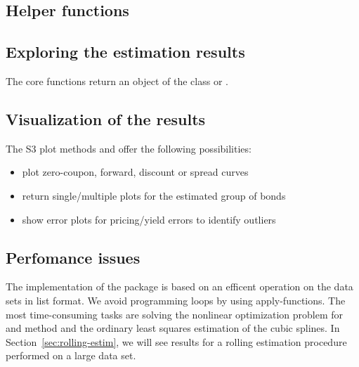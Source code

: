 \subsection{Helper functions}
\label{sec:helper-functions}


\subsection{Exploring the estimation results}
\label{sec:expl-estim-results}


The core functions return an object of the class  or .




\subsection{Visualization of the results}
\label{sec:visu-results}

The S3 plot methods  and  offer the following possibilities:

\begin{itemize}
\item plot zero-coupon, forward, discount or spread curves
\item return single/multiple plots for the estimated group of bonds
\item show error plots for pricing/yield errors to identify outliers
\end{itemize}

\subsection{Perfomance issues}
\label{sec:perfomance-issues}

The implementation of the  package is based on an efficent operation on the data sets in list format. We avoid programming loops by using apply-functions. The most time-consuming tasks are solving the nonlinear optimization problem for \cite{Nelson1987} and \cite{Svensson1994} method and the ordinary least squares estimation of the \cite{McCulloch1975} cubic splines. In Section~\ref{sec:rolling-estim}, we will see results for a rolling estimation procedure performed on a large data set.


